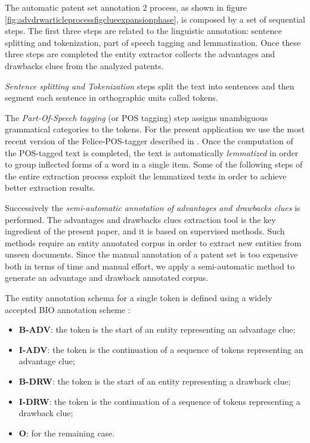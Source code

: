 \documentclass[]{book}
\providecommand{\tightlist}{%
  \setlength{\itemsep}{0pt}\setlength{\parskip}{0pt}}
\begin{document}
The automatic patent set annotation 2 process, as shown in figure
\ref{fig:advdrwarticleprocessfigclueexpansionphase}, is composed by a
set of sequential steps. The first three steps are related to the
linguistic annotation: sentence splitting and tokenization, part of
speech tagging and lemmatization. Once these three steps are completed
the entity extractor collects the advantages and drawbacks clues from
the analyzed patents.

\emph{Sentence splitting and Tokenization} steps split the text into
sentences and then segment each sentence in orthographic units called
tokens.

The \emph{Part-Of-Speech tagging} (or POS tagging) step assigns
unambiguous grammatical categories to the tokens. For the present
application we use the most recent version of the Felice-POS-tagger
described in \citep{dell2009ensemble}. Once the computation of the
POS-tagged text is completed, the text is automatically
\emph{lemmatized} in order to group inflected forms of a word in a
single item. Some of the following steps of the entire extraction
process exploit the lemmatized texts in order to achieve better
extraction results.

Successively the \emph{semi-automatic annotation of advantages and
drawbacks clues} is performed. The advantages and drawbacks clues
extraction tool is the key ingredient of the present paper, and it is
based on supervised methods. Such methods require an entity annotated
corpus in order to extract new entities from unseen documents. Since the
manual annotation of a patent set is too expensive both in terms of time
and manual effort, we apply a semi-automatic method to generate an
advantage and drawback annotated corpus.

The entity annotation schema for a single token is defined using a
widely accepted BIO annotation scheme \citep{ramshaw}:

\begin{itemize}
\tightlist
\item
  \textbf{B-ADV}: the token is the start of an entity representing an
  advantage clue;
\item
  \textbf{I-ADV}: the token is the continuation of a sequence of tokens
  representing an advantage clue;
\item
  \textbf{B-DRW}: the token is the start of an entity representing a
  drawback clue;
\item
  \textbf{I-DRW}: the token is the continuation of a sequence of tokens
  representing a drawback clue;
\item
  \textbf{O}: for the remaining case.
\end{itemize}
\end{document}
